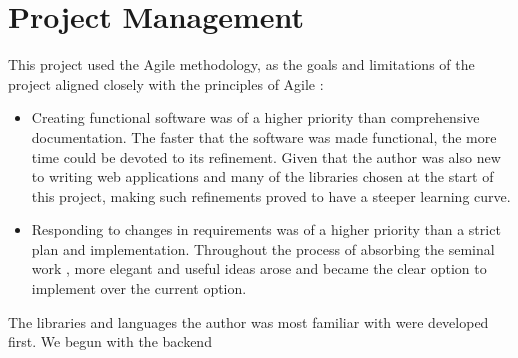 \section{Project Management}

This project used the Agile methodology, as the goals and limitations of the project aligned closely with the principles of Agile \cite{agilePrinciples}:
\begin{itemize}
    \item Creating functional software was of a higher priority than comprehensive documentation. The faster that the software was made functional, the more time could be devoted to its refinement. Given that the author was also new to writing web applications and many of the libraries chosen at the start of this project, making such refinements proved to have a steeper learning curve.
    \item Responding to changes in requirements was of a higher priority than a strict plan and implementation. Throughout the process of absorbing the seminal work \cite{chistikov2020re}, more elegant and useful ideas arose and became the clear option to implement over the current option.
\end{itemize}
\noindent The libraries and languages the author was most familiar with were developed first. We begun with the backend
